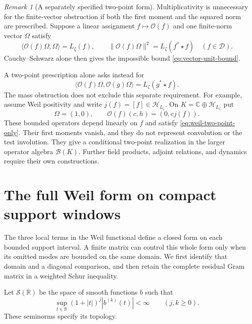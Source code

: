 \documentclass[11pt]{article}
\theoremstyle{definition}
\theoremstyle{remark}
\newtheorem{remark}[theorem]{Remark}
\numberwithin{equation}{section}
\newcommand{\R}{\mathbb R}
\newcommand{\C}{\mathbb C}
\begin{document}
\begin{remark}[A separately specified two-point form]
\label{rem:weil-two-point}
Multiplicativity is unnecessary for the finite-vector obstruction if
both the first moment and the squared norm are prescribed.
Suppose a linear assignment $f\mapsto\mathcal O(f)$ and one finite-norm
vector $\Omega$ satisfy
\[
 \langle\mathcal O(f)\Omega,\Omega\rangle=L_\zeta(f),
 \qquad
 \|\mathcal O(f)\Omega\|^2=L_\zeta(f^*\star f)
 \quad(f\in\mathscr D).
\]
Cauchy--Schwarz alone then gives the impossible bound
\eqref{eq:vector-unit-bound}.

A two-point prescription alone asks instead for
\begin{equation}
 \langle\mathcal O(f)\Omega,\mathcal O(g)\Omega\rangle
       =L_\zeta(g^*\star f).
 \label{eq:weil-two-point-only}
\end{equation}
The mass obstruction does not exclude this separate requirement.
For example, assume Weil positivity and write $j(f)=[f]\in\mathcal H_{L_\zeta}$.
On $K=\C\oplus\mathcal H_{L_\zeta}$ put
\[
 \Omega=(1,0),\qquad \mathcal O(f)(c,h)=(0,cj(f)).
\]
These bounded operators depend linearly on $f$ and satisfy
\eqref{eq:weil-two-point-only}.
Their first moments vanish, and they do not represent convolution or
the test involution.
They give a conditional two-point realization in the larger operator
algebra $\mathcal B(K)$.
Further field products, adjoint relations, and dynamics require their
own constructions.
\end{remark}

\section{The full Weil form on compact support windows}
\label{sec:compact-weil}

The three local terms in the Weil functional define a closed form on
each bounded support interval.  A finite matrix can control this whole
form only when its omitted modes are bounded on the same domain.  We
first identify that domain and a diagonal comparison, and then retain
the complete residual Gram matrix in a weighted Schur inequality.

Let $\mathscr S(\R)$ be the space of smooth functions $b$ such that
\[
 \sup_{t\in\R}(1+|t|)^j|b^{(k)}(t)|<\infty
 \qquad(j,k\geq0).
\]
These seminorms specify its topology.
\end{document}
